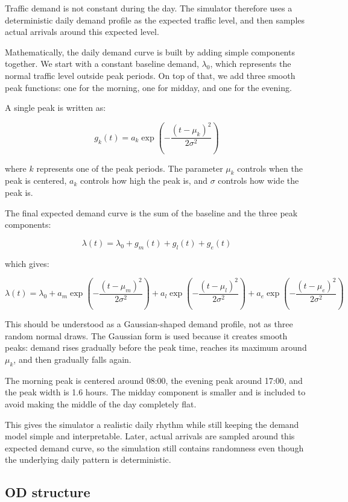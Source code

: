 \documentclass[11pt]{article}
\begin{document}
Traffic demand is not constant during the day. The simulator therefore
uses a deterministic daily demand profile as the expected traffic level,
and then samples actual arrivals around this expected level.

Mathematically, the daily demand curve is built by adding simple
components together. We start with a constant baseline demand,
\(\lambda_0\), which represents the normal traffic level outside peak
periods. On top of that, we add three smooth peak functions: one for the
morning, one for midday, and one for the evening.

A single peak is written as:

\[
g_k(t)
=
a_k \exp\left(-\frac{(t-\mu_k)^2}{2\sigma^2}\right)
\]

where \(k\) represents one of the peak periods. The parameter \(\mu_k\)
controls when the peak is centered, \(a_k\) controls how high the peak
is, and \(\sigma\) controls how wide the peak is.

The final expected demand curve is the sum of the baseline and the three
peak components:

\[
\lambda(t)
=
\lambda_0
+
g_m(t)
+
g_l(t)
+
g_e(t)
\]

which gives:

\[
\lambda(t)
=
\lambda_0
+
a_m \exp\left(-\frac{(t-\mu_m)^2}{2\sigma^2}\right)
+
a_l \exp\left(-\frac{(t-\mu_l)^2}{2\sigma^2}\right)
+
a_e \exp\left(-\frac{(t-\mu_e)^2}{2\sigma^2}\right)
\]

This should be understood as a Gaussian-shaped demand profile, not as
three random normal draws. The Gaussian form is used because it creates
smooth peaks: demand rises gradually before the peak time, reaches its
maximum around \(\mu_k\), and then gradually falls again.

The morning peak is centered around 08:00, the evening peak around
17:00, and the peak width is 1.6 hours. The midday component is smaller
and is included to avoid making the middle of the day completely flat.

This gives the simulator a realistic daily rhythm while still keeping
the demand model simple and interpretable. Later, actual arrivals are
sampled around this expected demand curve, so the simulation still
contains randomness even though the underlying daily pattern is
deterministic.

    \subsection{OD structure}\label{od-structure}
\end{document}
